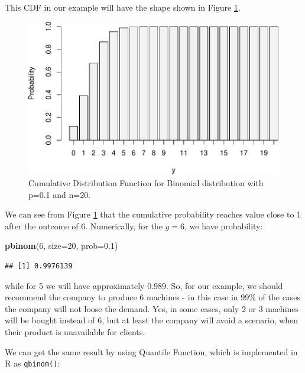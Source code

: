 \documentclass[
]{book}
\newenvironment{Shaded}{\begin{snugshade}}{\end{snugshade}}
\newcommand{\AttributeTok}[1]{\textcolor[rgb]{0.13,0.29,0.53}{#1}}
\newcommand{\DecValTok}[1]{\textcolor[rgb]{0.00,0.00,0.81}{#1}}
\newcommand{\FloatTok}[1]{\textcolor[rgb]{0.00,0.00,0.81}{#1}}
\newcommand{\FunctionTok}[1]{\textcolor[rgb]{0.13,0.29,0.53}{\textbf{#1}}}
\newcommand{\NormalTok}[1]{#1}
\theoremstyle{definition}
\theoremstyle{definition}
\theoremstyle{definition}
\theoremstyle{definition}
\theoremstyle{remark}
\begin{document}
This CDF in our example will have the shape shown in Figure \ref{fig:binomialCDF01}.

\begin{figure}
\centering
\includegraphics{Svetunkov---Statistics-for-Business-Analytics_files/figure-latex/binomialCDF01-1.pdf}
\caption{\label{fig:binomialCDF01}Cumulative Distribution Function for Binomial distribution with p=0.1 and n=20.}
\end{figure}

We can see from Figure \ref{fig:binomialCDF01} that the cumulative probability reaches value close to 1 after the outcome of 6. Numerically, for the \(y=6\), we have probability:

\begin{Shaded}
\begin{Highlighting}[]
\FunctionTok{pbinom}\NormalTok{(}\DecValTok{6}\NormalTok{, }\AttributeTok{size=}\DecValTok{20}\NormalTok{, }\AttributeTok{prob=}\FloatTok{0.1}\NormalTok{)}
\end{Highlighting}
\end{Shaded}

\begin{verbatim}
## [1] 0.9976139
\end{verbatim}

while for 5 we will have approximately 0.989. So, for our example, we should recommend the company to produce 6 machines - in this case in 99\% of the cases the company will not loose the demand. Yes, in some cases, only 2 or 3 machines will be bought instead of 6, but at least the company will avoid a scenario, when their product is unavailable for clients.

We can get the same result by using Quantile Function, which is implemented in R as \texttt{qbinom()}:
\end{document}
